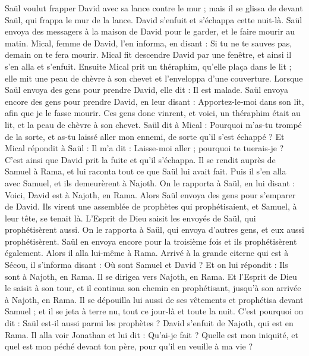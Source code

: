 \begin{multicols}{2}
Saül voulut frapper David avec sa lance contre le mur ; mais il se glissa de devant Saül, qui frappa le mur de la lance. David s'enfuit et s'échappa cette nuit-là.
Saül envoya des messagers à la maison de David pour le garder, et le faire mourir au matin. Mical, femme de David, l'en informa, en disant : Si tu ne te sauves pas, demain on te fera mourir.
Mical fit descendre David par une fenêtre, et ainsi il s'en alla et s'enfuit.
Ensuite Mical prit un théraphim, qu'elle plaça dans le lit ; elle mit une peau de chèvre à son chevet et l'enveloppa d'une couverture.
Lorsque Saül envoya des gens pour prendre David, elle dit : Il est malade.
Saül envoya encore des gens pour prendre David, en leur disant : Apportez-le-moi dans son lit, afin que je le fasse mourir.
Ces gens donc vinrent, et voici, un théraphim était au lit, et la peau de chèvre à son chevet.
Saül dit à Mical : Pourquoi m'as-tu trompé de la sorte, et as-tu laissé aller mon ennemi, de sorte qu'il s'est échappé ? Et Mical répondit à Saül : Il m'a dit : Laisse-moi aller ; pourquoi te tuerais-je ?
C'est ainsi que David prit la fuite et qu'il s'échappa. Il se rendit auprès de Samuel à Rama, et lui raconta tout ce que Saül lui avait fait. Puis il s'en alla avec Samuel, et ils demeurèrent à Najoth.
On le rapporta à Saül, en lui disant : Voici, David est à Najoth, en Rama.
Alors Saül envoya des gens pour s'emparer de David. Ils virent une assemblée de prophètes qui prophétisaient, et Samuel, à leur tête, se tenait là. L'Esprit de Dieu saisit les envoyés de Saül, qui prophétisèrent aussi.
On le rapporta à Saül, qui envoya d'autres gens, et eux aussi prophétisèrent. Saül en envoya encore pour la troisième fois et ils prophétisèrent également.
Alors il alla lui-même à Rama. Arrivé à la grande citerne qui est à Sécou, il s'informa disant : Où sont Samuel et David ? Et on lui répondit : Ils sont à Najoth, en Rama.
Il se dirigea vers Najoth, en Rama. Et l'Esprit de Dieu le saisit à son tour, et il continua son chemin en prophétisant, jusqu'à son arrivée à Najoth, en Rama.
Il se dépouilla lui aussi de ses vêtements et prophétisa devant Samuel ; et il se jeta à terre nu, tout ce jour-là et toute la nuit. C'est pourquoi on dit : Saül est-il aussi parmi les prophètes ?
\VerseOne{}David s'enfuit de Najoth, qui est en Rama. Il alla voir Jonathan et lui dit : Qu'ai-je fait ? Quelle est mon iniquité, et quel est mon péché devant ton père, pour qu'il en veuille à ma vie ?

\end{multicols}
